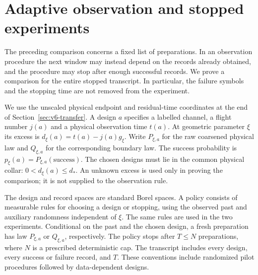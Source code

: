 \section{Adaptive observation and stopped experiments}
\label{sec:v16-adaptive}
The preceding comparison concerns a fixed list of preparations. In an
observation procedure the next window may instead depend on the records
already obtained, and the procedure may stop after enough successful
records. We prove a comparison for the entire stopped transcript. In
particular, the failure symbols and the stopping time are not removed
from the experiment.

We use the unscaled physical endpoint and residual-time coordinates
at the end of Section~\ref{sec:v6-transfer}. A design $a$ specifies a
labelled channel, a flight number $j(a)$ and a physical observation time
$t(a)$. At geometric parameter $\xi$ its excess is
$d_\xi(a)=t(a)-j(a)g_\xi$. Write $P_{\xi,a}$ for the raw coarsened
physical law and $Q_{\xi,a}$ for the corresponding boundary law. The
success probability is $p_\xi(a)=P_{\xi,a}(\text{success})$.
The chosen designs must lie in the common physical collar:
$0<d_\xi(a)\le d_*$. An unknown excess is used only in proving the
comparison; it is not supplied to the observation rule.

The design and record spaces are standard Borel spaces. A policy consists
of measurable rules for choosing a design or stopping, using the observed
past and auxiliary randomness independent of $\xi$. The same rules are
used in the two experiments. Conditional on the past and the chosen
design, a fresh preparation has law $P_{\xi,a}$ or $Q_{\xi,a}$,
respectively. The policy stops after $T\le N$ preparations, where $N$ is
a prescribed deterministic cap. The transcript includes every design,
every success or failure record, and $T$. These conventions include
randomized pilot procedures followed by data-dependent designs.

